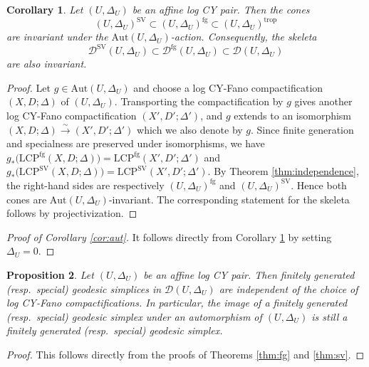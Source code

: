 \documentclass[reqno, 12pt]{amsart}
\newtheorem{prop}{Proposition}[section]
\newtheorem{cor}[prop]{Corollary}
\theoremstyle{definition}
\newcommand{\cD}{\mathcal{D}}
\newcommand{\Aut}{\mathrm{Aut}}
\newcommand{\trop}{\mathrm{trop}}
\newcommand{\SV}{\mathrm{SV}}
\newcommand{\rfg}{\mathrm{fg}}
\newcommand{\LCP}{\mathrm{LCP}}
\numberwithin{equation}{section}
\begin{document}
\begin{cor}\label{cor:aut-pair}
    Let $(U,\Delta_U)$ be an affine log CY pair. Then the cones
\[
(U,\Delta_U)^{\SV}
\subset
(U,\Delta_U)^{\rfg}
\subset
(U,\Delta_U)^{\trop}
\]
are invariant under the $\Aut(U,\Delta_U)$-action. Consequently, the skeleta
\[
\cD^{\SV}(U,\Delta_U)
\subset
\cD^{\rfg}(U,\Delta_U)
\subset
\cD(U,\Delta_U)
\]
are also invariant.
\end{cor}
\begin{proof}
Let $g\in\Aut(U,\Delta_U)$ and choose a log CY-Fano compactification
$(X,D;\Delta)$ of $(U,\Delta_U)$. Transporting the compactification by $g$
gives another log CY-Fano compactification $(X',D';\Delta')$, and $g$ extends to an isomorphism
$(X,D;\Delta)\xrightarrow{\sim}(X',D';\Delta')$ which we also denote by $g$.
Since finite generation and specialness are preserved under isomorphisms, 
we have $g_*\bigl(\LCP^{\rfg}(X,D;\Delta)\bigr)
 =\LCP^{\rfg}(X',D';\Delta')$ and
$g_*\bigl(\LCP^{\SV}(X,D;\Delta)\bigr)
 =\LCP^{\SV}(X',D';\Delta')$.
By Theorem \ref{thm:independence}, the right-hand sides are respectively
$(U,\Delta_U)^{\rfg}$ and $(U,\Delta_U)^{\SV}$.
Hence both cones are $\Aut(U,\Delta_U)$-invariant.
The corresponding statement for the skeleta follows by projectivization.
\end{proof}

\begin{proof}[Proof of Corollary \ref{cor:aut}]
It follows directly from Corollary \ref{cor:aut-pair} by setting $\Delta_U = 0$.
\end{proof}

\begin{prop}\label{prop:geod-indep}
Let $(U,\Delta_U)$ be an affine log CY pair. Then finitely generated (resp.\ special) geodesic simplices in $\cD(U,\Delta_U)$ are independent of the choice of log CY-Fano compactifications. In particular, the image of a finitely generated (resp.\ special) geodesic simplex under an automorphism of $(U,\Delta_U)$ is still a finitely generated (resp.\ special) geodesic simplex.
\end{prop}

\begin{proof}
This follows directly from the proofs of Theorems \ref{thm:fg} and \ref{thm:sv}.
\end{proof}
\end{document}
